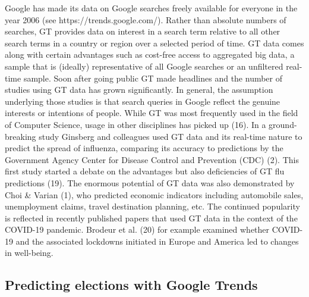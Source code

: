 \documentclass[
  letterpaper,
  DIV=11,
  numbers=noendperiod]{scrartcl}
\begin{document}
Google has made its data on Google searches freely available for
everyone in the year 2006 (see https://trends.google.com/). Rather than
absolute numbers of searches, GT provides data on interest in a search
term relative to all other search terms in a country or region over a
selected period of time. GT data comes along with certain advantages
such as cost-free access to aggregated big data, a sample that is
(ideally) representative of all Google searches or an unﬁltered
real-time sample. Soon after going public GT made headlines and the
number of studies using GT data has grown significantly. In general, the
assumption underlying those studies is that search queries in Google
reﬂect the genuine interests or intentions of people. While GT was most
frequently used in the ﬁeld of Computer Science, usage in other
disciplines has picked up (16). In a ground-breaking study Ginsberg and
colleagues used GT data and its real-time nature to predict the spread
of inﬂuenza, comparing its accuracy to predictions by the Government
Agency Center for Disease Control and Prevention (CDC) (2). This first
study started a debate on the advantages but also deficiencies of GT flu
predictions (19). The enormous potential of GT data was also
demonstrated by Choi \& Varian (1), who predicted economic indicators
including automobile sales, unemployment claims, travel destination
planning, etc. The continued popularity is reﬂected in recently
published papers that used GT data in the context of the COVID-19
pandemic. Brodeur et al. (20) for example examined whether COVID-19 and
the associated lockdowns initiated in Europe and America led to changes
in well-being.

\hypertarget{predicting-elections-with-google-trends}{%
\subsection{Predicting elections with Google
Trends}\label{predicting-elections-with-google-trends}}
\end{document}
